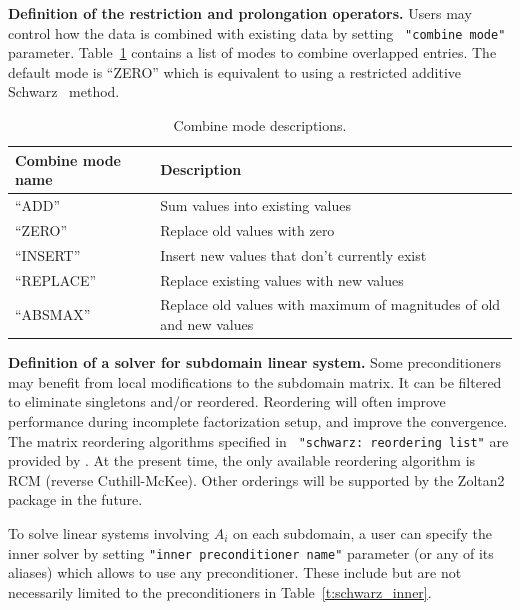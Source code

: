 {\bf Definition of the restriction and prolongation operators.}
Users may control how the data is combined with existing data by setting {\tt
"combine mode"} parameter. Table~\ref{t:combine_mode} contains a list of modes to
combine overlapped entries. The default mode is ``ZERO'' which is equivalent to
using a restricted additive Schwarz~\cite{Cai1999} method.

\begin{table}[htbp]
  \centering
  \begin{tabular}{p{3.5cm} p{12.0cm}}
    \toprule
    Combine mode name & Description \\
    \midrule
    ``ADD''           & Sum values into existing values \\
    ``ZERO''          & Replace old values with zero \\
    ``INSERT''        & Insert new values that don't currently exist \\
    ``REPLACE''       & Replace existing values with new values \\
    ``ABSMAX''        & Replace old values with maximum of magnitudes of old and new values \\
    \bottomrule
  \end{tabular}
  \caption{\label{t:combine_mode}Combine mode descriptions.}
\end{table}

{\bf Definition of a solver for subdomain linear system.}
Some preconditioners may benefit from local modifications to the subdomain
matrix. It can be filtered to eliminate singletons and/or reordered.
Reordering will often improve performance during incomplete factorization setup,
and improve the convergence. The matrix reordering algorithms specified in {\tt
"schwarz: reordering list"} are provided by \zoltantwo.  At the present time,
the only available reordering algorithm is RCM (reverse Cuthill-McKee). Other
orderings will be supported by the Zoltan2 package in the future.

To solve linear systems involving $A_i$ on each subdomain, a user can specify
the inner solver by setting {\tt "inner preconditioner name"} parameter (or any
of its aliases) which allows to use any \ifpacktwo preconditioner. These include
but are not necessarily limited to the preconditioners in
Table~\ref{t:schwarz_inner}.

